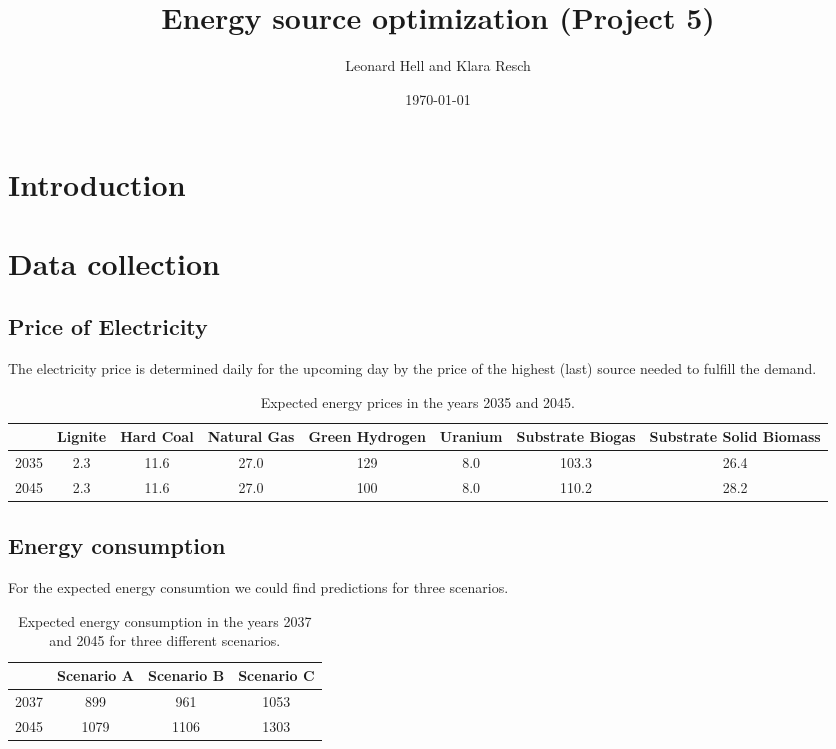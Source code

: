 \documentclass[a4paper,12pt]{article}
\title{Energy source optimization (Project 5)}
\author{Leonard Hell and Klara Resch}
\date{\today}
\begin{document}
\maketitle
\section{Introduction}
\section{Data collection}
\subsection{Price of Electricity}
The electricity price is determined daily for the upcoming day by the price of the highest (last) source needed to fulfill the demand.
\begin{table}[h]
    \centering
    \begin{tabular}{|c|c|c|c|c|c|c|c}
        \hline
        & Lignite & Hard Coal & Natural Gas & Green Hydrogen & Uranium & Substrate Biogas & Substrate Solid Biomass \\
        \hline
        2035 & 2.3 & 11.6 & 27.0 & 129 & 8.0 & 103.3 & 26.4\\
        2045 & 2.3 & 11.6 & 27.0 & 100 & 8.0 & 110.2 & 28.2\\
        \hline
    \end{tabular}
    \caption{Expected energy prices in the years 2035 and 2045.\cite{ISE2024}}
    \label{tab:energy}
\end{table}

\subsection{Energy consumption}
For the expected energy consumtion we could find predictions for three scenarios.
\begin{table}[h]
    \centering
    \begin{tabular}{|c|c|c|c|}
        \hline
        & Scenario A & Scenario B & Scenario C \\
        \hline
        2037 & 899&961&1053 \\
        2045 &1079&1106&1303 \\
        \hline
    \end{tabular}
    \caption{Expected energy consumption in the years 2037 and 2045 for three different scenarios.\cite{futuredemand3745}}
    \label{tab:demand}
\end{table}
\newpage
\printbibliography[title={References}]
\end{document}
